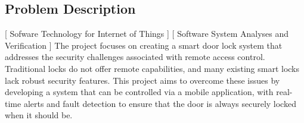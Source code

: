 \subsection{Problem Description}
[ Sofware Technology for Internet of Things ] [ Software System Analyses and Verification ]
\newline
The project focuses on creating a smart door lock system that addresses the security challenges associated with remote access control. Traditional locks do not offer remote capabilities, and many existing smart locks lack robust security features. This project aims to overcome these issues by developing a system that can be controlled via a mobile application, with real-time alerts and fault detection to ensure that the door is always securely locked when it should be.
